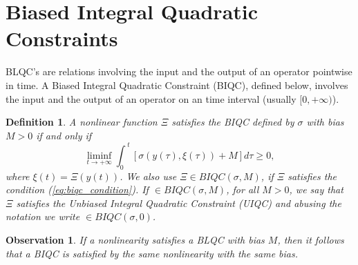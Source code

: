 \documentclass[letterpaper,10pt,conference,twocolumn]{IEEEtran}
\newtheorem{dfn}{Definition}
\newtheorem{lem}[thm]{Lemma}
\newtheorem{obs}{Observation}
\newcommand{\Csi}{\Xi}
\begin{document}
\section{Biased Integral Quadratic Constraints}\label{sec:BIQC}
BLQC's are relations involving the input and the output of an operator pointwise in time. A Biased Integral Quadratic Constraint (BIQC), defined below, involves the input and the output of an operator on an time interval (usually $[0, +\infty)$).
\begin{dfn}\label{dfn:BIQC}
	A nonlinear function $\Xi$ satisfies the BIQC defined by $\sigma$ with bias $M>0$ if and only if
	\begin{equation}\label{eq:biqc_condition}
		\liminf_{t\rightarrow +\infty}
			\int_0^{~t}[\sigma(y(\tau),\xi(\tau)) + M ]d\tau\geq 0,
	\end{equation}
	where $\xi(t)=\Csi(y(t))$.
	We also use $\Csi \in BIQC(\sigma,M)$, if $\Xi$ satisfies the condition (\ref{eq:biqc_condition}). If $\in BIQC(\sigma,M)$, for all $M>0$, we say that $\Xi$ satisfies the Unbiased Integral Quadratic Constraint (UIQC) and abusing the notation we write $\in BIQC(\sigma,0)$.
\end{dfn}
\begin{obs}
	If a nonlinearity satisfies a BLQC with bias $M$, then it follows that a BIQC is satisfied by the same nonlinearity with the same bias.
\end{obs}
%
\end{document}
